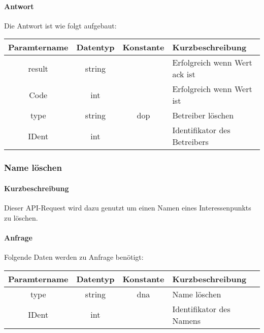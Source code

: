\paragraph{Antwort}Die Antwort ist wie folgt aufgebaut:
\begin{table}[H]
	\begin{tabular}{|c|c|c|p{6.5cm}|}
		\hline
		\textbf{Paramtername} & \textbf{Datentyp} & \textbf{Konstante} & \textbf{Kurzbeschreibung}                                                                                               \\ \hline
		result              & string           &                 & Erfolgreich wenn Wert {\glqq ack\grqq} ist \\ \hline
		Code                & int              &                 & Erfolgreich wenn Wert {\glqq 0\grqq} ist \\ \hline
		type                & string           & dop             & Betreiber löschen \\ \hline
		IDent               & int              &                 & Identifikator des Betreibers \\ \hline
	\end{tabular}
\end{table}
\subsubsection{Name löschen}
\paragraph{Kurzbeschreibung}Dieser API-Request wird dazu genutzt um einen Namen eines Interessenpunkts zu löschen.
\paragraph{Anfrage}Folgende Daten werden zu Anfrage benötigt:
\begin{table}[H]
	\begin{tabular}{|c|c|c|p{6.5cm}|}
		\hline
		\textbf{Paramtername} & \textbf{Datentyp} & \textbf{Konstante} & \textbf{Kurzbeschreibung}                                                                                               \\ \hline
		type                & string            & dna                & Name löschen \\ \hline
		IDent               & int               &                    & Identifikator des Namens \\ \hline
	\end{tabular}
\end{table}
